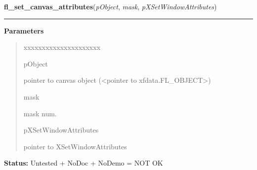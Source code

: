 \hspace{.8\funcindent}\begin{boxedminipage}{\funcwidth}

    \raggedright \textbf{fl\_set\_canvas\_attributes}(\textit{pObject}, \textit{mask}, \textit{pXSetWindowAttributes})

    \vspace{-1.5ex}

    \rule{\textwidth}{0.5\fboxrule}
\setlength{\parskip}{2ex}
\setlength{\parskip}{1ex}
      \textbf{Parameters}
      \vspace{-1ex}

      \begin{quote}
        \begin{Ventry}{xxxxxxxxxxxxxxxxxxxxx}

          \item[pObject]

          pointer to canvas object ({\textless}pointer to 
          xfdata.FL\_OBJECT{\textgreater})

          \item[mask]

          mask num.

          \item[pXSetWindowAttributes]

          pointer to XSetWindowAttributes

        \end{Ventry}

      \end{quote}

\textbf{Status:} Untested + NoDoc + NoDemo = NOT OK



    \end{boxedminipage}

    \label{xformslib:library:fl_add_canvas_handler}

    \vspace{0.5ex}

